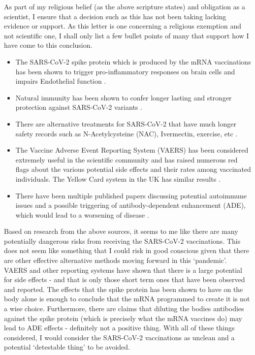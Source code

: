 \documentclass[10pt, a4paper, twocolumn]{book}
\begin{document}
As part of my religious belief (as the above scripture states) and obligation as a scientist, I ensure that a decision such as this has not been taking lacking evidence or support. As this letter is one concerning a religious exemption and not scientific one, I shall only list a few bullet points of many that support how I have come to this conclusion.

\begin{itemize}
	\item The SARS-CoV-2 spike protein which is produced by the mRNA vaccinations has been shown to trigger pro-inflammatory responses on brain cells \citep{covid:spike} and impairs Endothelial function \citep{covid:spike2}.
	\item Natural immunity has been shown to confer longer lasting and stronger protection against SARS-CoV-2 variants \citep{covid:natural}.
	\item There are alternative treatments for SARS-CoV-2 that have much longer safety records such as N-Acetylcysteine (NAC), Ivermectin, exercise, etc \citep{GlobalTrendsIvermectin}.
	\item The Vaccine Adverse Event Reporting System (VAERS) has been considered extremely useful in the scientific community and has raised numerous red flags about the various potential side effects and their rates among vaccinated individuals. The Yellow Card system in the UK has similar results \citep{YellowCard}.
	\item There have been multiple published papers discussing potential autoimmune issues \citep{WorseThanTheDisease} and a possible triggering of antibody-dependent enhancement (ADE), which would lead to a worsening of disease \citep{ADESpikeProtein}. 
\end{itemize}

Based on research from the above sources, it seems to me like there are many potentially dangerous risks from receiving the SARS-CoV-2 vaccinations. This does not seem like something that I could risk in good conscious given that there are other effective alternative methods moving forward in this `pandemic'. VAERS and other reporting systems have shown that there is a large potential for side effects - and that is only those short term ones that have been observed and reported. The effects that the spike protein has been shown to have on the body alone is enough to conclude that the mRNA programmed to create it is not a wise choice. Furthermore, there are claims that diluting the bodies antibodies against the spike protein (which is precisely what the mRNA vaccines do) may lead to ADE effects - definitely not a positive thing. With all of these things considered, I would consider the SARS-CoV-2 vaccinations as unclean and a potential `detestable thing' to be avoided.
\end{document}
